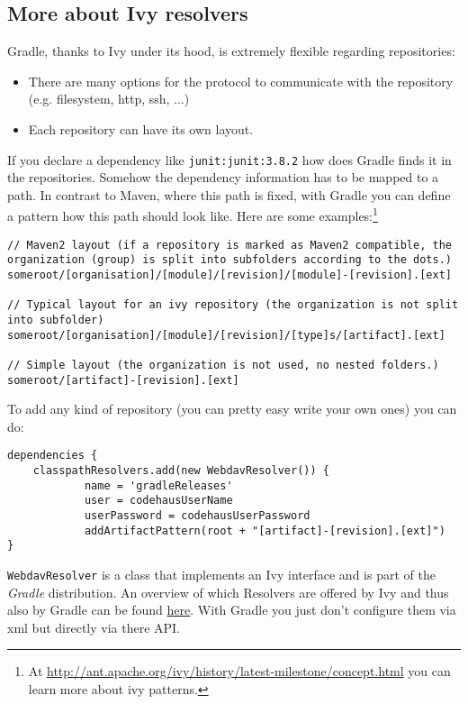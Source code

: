 \subsection{More about Ivy resolvers} %
\label{sub:more_about_ivy_resolvers}
Gradle, thanks to Ivy under its hood, is extremely flexible regarding repositories:
\begin{itemize}
	\item There are many options for the protocol to communicate with the repository (e.g. filesystem, http, ssh, ...)
	\item Each repository can have its own layout.
\end{itemize}
If you declare a dependency like \texttt{junit:junit:3.8.2} how does Gradle finds it in the repositories. Somehow the dependency information has to be mapped to a path. In contrast to Maven, where this path is fixed, with Gradle you can define a pattern how this path should look like. Here are some examples:\footnote{At \url{http://ant.apache.org/ivy/history/latest-milestone/concept.html} you can learn more about ivy patterns.}
\begin{Verbatim}
// Maven2 layout (if a repository is marked as Maven2 compatible, the organization (group) is split into subfolders according to the dots.)
someroot/[organisation]/[module]/[revision]/[module]-[revision].[ext]

// Typical layout for an ivy repository (the organization is not split into subfolder)
someroot/[organisation]/[module]/[revision]/[type]s/[artifact].[ext]

// Simple layout (the organization is not used, no nested folders.)
someroot/[artifact]-[revision].[ext]
\end{Verbatim}
To add any kind of repository (you can pretty easy write your own ones) you can do:
\begin{Verbatim}
dependencies {
	classpathResolvers.add(new WebdavResolver()) {
	        name = 'gradleReleases'
	        user = codehausUserName
	        userPassword = codehausUserPassword
	        addArtifactPattern(root + "[artifact]-[revision].[ext]")
}	
\end{Verbatim}
\texttt{WebdavResolver} is a class that implements an Ivy interface and is part of the \emph{Gradle} distribution. An overview of which Resolvers are offered by Ivy and thus also by Gradle can be found \href{http://ant.apache.org/ivy/latest-milestone/configuration/resolvers.html}{here}. With Gradle you just don't configure them via xml but directly via there API.
